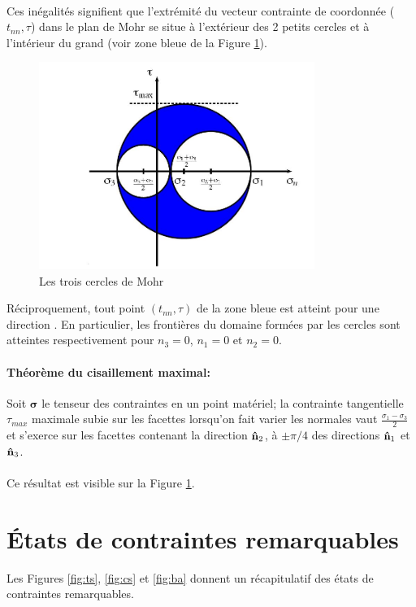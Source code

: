 \paragraph{}
Ces inégalités signifient que l'extrémité du vecteur contrainte  de coordonnée ($t_{nn},\tau$) dans le plan de Mohr se situe à l'extérieur des 2 petits cercles et à l'intérieur du grand (voir zone bleue de la Figure \ref{fig:mohr}).
\begin{figure}[!h]
\centering
\includegraphics[width = 0.8\textwidth]{./mohr}
\caption{Les trois cercles de Mohr}
\label{fig:mohr}
\end{figure}
Réciproquement, tout point $(t_{nn},\tau)$ de la zone bleue est atteint pour une direction . En particulier, les frontières du domaine formées par les cercles sont atteintes respectivement pour $n_3=0$, $n_1=0$ et $n_2=0$.
\paragraph{Théorème du cisaillement maximal:} Soit $\boldsymbol{\sigma}$ le tenseur des contraintes en un point
matériel; la contrainte tangentielle $\tau_{max}$ maximale subie sur les facettes lorsqu'on fait varier
les normales  vaut $\frac{\sigma_1-\sigma_3}{2}$ et s'exerce sur les facettes contenant la direction $\textbf{\^n}_2$, à  $\pm \pi/4$ des directions $\textbf{\^n}_1$ et $\textbf{\^n}_3$.
\paragraph{}
Ce résultat est visible sur la Figure \ref{fig:mohr}.

\section{\'Etats de contraintes remarquables}
Les Figures \ref{fig:ts}, \ref{fig:cs} et \ref{fig:ba} donnent un récapitulatif des états de contraintes remarquables.

